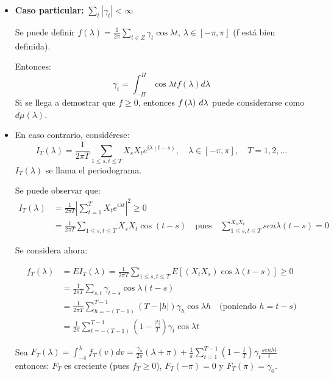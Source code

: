 \begin{itemize}
      \item \textbf{Caso particular:} $\sum\limits_t {\left| {\gamma_{t} } \right|<\infty }$\newline

Se puede definir $f\left( \lambda \right)=\frac{1}{2\pi }\sum\limits_{t\in Z} {\gamma_{t} \cos \lambda t}$, $\lambda \in \left[ {-\pi ,\pi } \right]$ (f est\'{a} bien definida).\newline

Entonces: 
\[
\gamma_{t} =\int_{-\Pi }^\Pi {\cos \lambda t} 
f\left( \lambda \right)d\lambda 
\]
Si se llega a demostrar que $f\ge 0$, entonces $f\left( \lambda \right){\kern 1pt}{\kern 1pt}d\lambda $ puede considerarse como $d\mu \left( \lambda \right)$.

      \item En caso contrario, consid\'{e}rese: 
\[
I_{T} (\lambda)=\frac{1}{2\pi T}\sum\limits_{1\le s,t\le T} {X_{s} } X_{t} e^{i\lambda (t-s)},\quad \lambda \in \left[-\pi, \pi \right], \quad T=1,2,\ldots
\]
$I_{T}(\lambda)$ se llama el periodograma.\newline

Se puede observar que:
\begin{align*}
I_{T} \left( \lambda \right) & = \frac{1}{2\pi T}\left| {\sum\limits_{t=1}^T {X_{t} e^{i\lambda t}} } \right|^{2}\ge 0\\
                             & = \frac{1}{2\pi T}\sum\limits_{1\le s,t\le T} {X_{s} X_{t} \cos ( t-s)} \quad \text{pues}\quad \limits \sum\limits_{1\le s,t\le T}^ {X_{s} X_{t} } sen\lambda (t-s)=0
\end{align*}

Se considera ahora: 

\begin{align*}
f_{T} (\lambda) &= EI_{T} (\lambda)=\frac{1}{2\pi T}\sum\limits_{1\leq s,t\leq T} {E\left[ {\left(X_{t} X_{s} \right)\cos \lambda (t-s)} \right]\ge 0}\\
                &= \frac{1}{2\pi T}\sum\limits_{s,t} {\gamma_{t-s} } \cos \lambda \left( {t-s} \right)\\
                &= \frac{1}{2\pi T}\sum\limits_{h=-(T-1)}^{T-1} {\left(T-|h| \right)}\gamma_{h} \cos \lambda h\quad \text{(poniendo $h=t-s$)}\\
                &= \frac{1}{2\pi }\sum\limits_{t=-(T-1)}^{T-1} {\left( {1-\frac{\left| t \right|}{T}} \right)} \gamma_{t} \cos \lambda t
\end{align*}

Sea $F_{T}(\lambda)=\int_{-\pi }^\lambda {f_{T} (v)dv=\frac{\gamma_{o}}{2\pi}(\lambda +\pi)+\frac{1}{\pi}\displaystyle\sum\limits_{t=1}^{T-1} {\left( {1-\frac{t}{T}} \right)}\gamma_{t} \frac{sen\lambda t}{t}}$ entonces: $F_{T}$ es creciente (pues $f_{T} \ge 0$),  $F_{T}(-\pi)=0$ y $F_{T}(\pi)=\gamma_{0}$.

\end{itemize}

